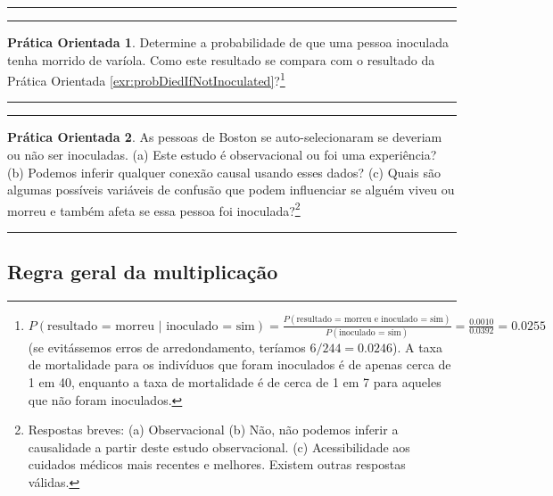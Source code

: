 \documentclass[
]{book}
\theoremstyle{definition}
\theoremstyle{definition}
\theoremstyle{definition}
\newtheorem{exercise}{Prática Orientada}[chapter]
\theoremstyle{definition}
\theoremstyle{remark}
\begin{document}
\begin{center}\rule{0.5\linewidth}{0.5pt}\end{center}

\begin{center}\rule{0.5\linewidth}{0.5pt}\end{center}

\begin{exercise}
\protect\hypertarget{exr:unnamed-chunk-60}{}{\label{exr:unnamed-chunk-60} }Determine a probabilidade de que uma pessoa inoculada tenha morrido de varíola. Como este resultado se compara com o resultado da Prática Orientada \ref{exr:probDiedIfNotInoculated}?\footnote{\(P(\text{resultado = morreu | inoculado = sim}) = \frac{P(\text{resultado = morreu e inoculado = sim})}{P(\text{inoculado = sim})} = \frac{0.0010}{0.0392} = 0.0255\) (se evitássemos erros de arredondamento, teríamos \(6 / 244 = 0.0246\)). A taxa de mortalidade para os indivíduos que foram inoculados é de apenas cerca de 1 em 40, enquanto a taxa de mortalidade é de cerca de 1 em 7 para aqueles que não foram inoculados.}
\end{exercise}

\begin{center}\rule{0.5\linewidth}{0.5pt}\end{center}

\begin{center}\rule{0.5\linewidth}{0.5pt}\end{center}

\begin{exercise}
\protect\hypertarget{exr:SmallpoxInoculationObsExpExercise}{}{\label{exr:SmallpoxInoculationObsExpExercise} }As pessoas de Boston se auto-selecionaram se deveriam ou não ser inoculadas.
(a) Este estudo é observacional ou foi uma experiência?
(b) Podemos inferir qualquer conexão causal usando esses dados?
(c) Quais são algumas possíveis variáveis de confusão que podem influenciar se alguém viveu ou morreu e também afeta se essa pessoa foi inoculada?\footnote{Respostas breves: (a) Observacional (b) Não, não podemos inferir a causalidade a partir deste estudo observacional. (c) Acessibilidade aos cuidados médicos mais recentes e melhores. Existem outras respostas válidas.}
\end{exercise}

\begin{center}\rule{0.5\linewidth}{0.5pt}\end{center}

\hypertarget{generalRuleMultiplication}{%
\subsection{Regra geral da multiplicação}\label{generalRuleMultiplication}}
\end{document}
